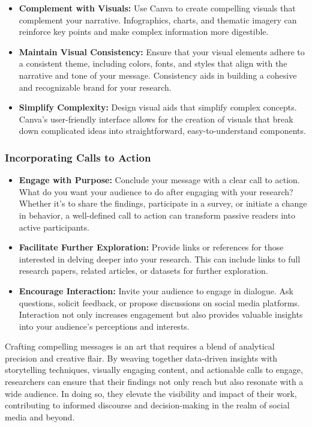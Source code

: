 \documentclass[
]{book}
\begin{document}
\begin{itemize}
\item
  \textbf{Complement with Visuals:} Use Canva to create compelling visuals that complement your narrative. Infographics, charts, and thematic imagery can reinforce key points and make complex information more digestible.
\item
  \textbf{Maintain Visual Consistency:} Ensure that your visual elements adhere to a consistent theme, including colors, fonts, and styles that align with the narrative and tone of your message. Consistency aids in building a cohesive and recognizable brand for your research.
\item
  \textbf{Simplify Complexity:} Design visual aids that simplify complex concepts. Canva's user-friendly interface allows for the creation of visuals that break down complicated ideas into straightforward, easy-to-understand components.
\end{itemize}

\hypertarget{incorporating-calls-to-action}{%
\subsubsection{Incorporating Calls to Action}\label{incorporating-calls-to-action}}

\begin{itemize}
\item
  \textbf{Engage with Purpose:} Conclude your message with a clear call to action. What do you want your audience to do after engaging with your research? Whether it's to share the findings, participate in a survey, or initiate a change in behavior, a well-defined call to action can transform passive readers into active participants.
\item
  \textbf{Facilitate Further Exploration:} Provide links or references for those interested in delving deeper into your research. This can include links to full research papers, related articles, or datasets for further exploration.
\item
  \textbf{Encourage Interaction:} Invite your audience to engage in dialogue. Ask questions, solicit feedback, or propose discussions on social media platforms. Interaction not only increases engagement but also provides valuable insights into your audience's perceptions and interests.
\end{itemize}

Crafting compelling messages is an art that requires a blend of analytical precision and creative flair. By weaving together data-driven insights with storytelling techniques, visually engaging content, and actionable calls to engage, researchers can ensure that their findings not only reach but also resonate with a wide audience. In doing so, they elevate the visibility and impact of their work, contributing to informed discourse and decision-making in the realm of social media and beyond.
\end{document}
